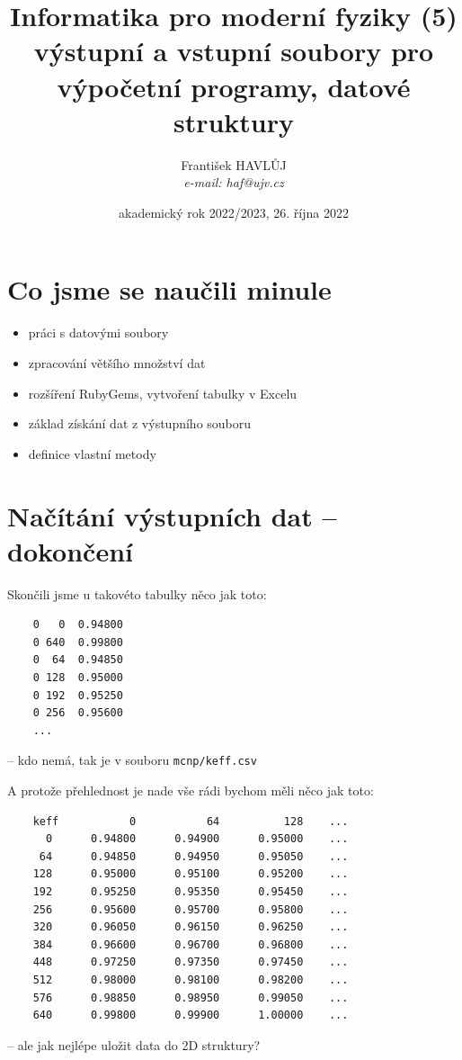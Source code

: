 \documentclass{beamer}
\title[IMF (5)]{Informatika pro moderní fyziky (5)\\výstupní a vstupní soubory pro výpočetní programy, datové struktury}
\author[Franti\v{s}ek HAVL\r{U}J, ORF ÚJV Řež]{Franti\v{s}ek HAVL\r{U}J\\{\scriptsize \emph{e-mail: haf@ujv.cz}}}
\date{akademický rok 2022/2023, 26. října 2022}
\institute[ORF ÚJV Řež]
{ÚJV Řež\\oddělení Reaktorové fyziky a podpory palivového cyklu}
\begin{document}
\begin{frame}
  \titlepage
\end{frame}

\begin{frame}
  \tableofcontents
\end{frame}

\section{Co jsme se naučili minule}

\begin{frame}{}
  \begin{itemize}
    \item práci s datovými soubory
    \item zpracování většího množství dat
    \item rozšíření RubyGems, vytvoření tabulky v Excelu
    \item základ získání dat z výstupního souboru
    \item definice vlastní metody
  \end{itemize}
\end{frame}

\section{Načítání výstupních dat – dokončení}

\begin{frame}[fragile]{Skončili jsme u takovéto tabulky}
  něco jak toto:
  {\scriptsize
  \begin{verbatim}
    0   0  0.94800
    0 640  0.99800
    0  64  0.94850
    0 128  0.95000
    0 192  0.95250
    0 256  0.95600
    ...
  \end{verbatim}
  }
  -- kdo nemá, tak je v souboru \texttt{mcnp/keff.csv}
\end{frame}

\begin{frame}[fragile]{A protože přehlednost je nade vše}
  rádi bychom měli něco jak toto:
  {\scriptsize
  \begin{verbatim}
    keff           0           64          128    ...
      0      0.94800      0.94900      0.95000    ...
     64      0.94850      0.94950      0.95050    ...
    128      0.95000      0.95100      0.95200    ...
    192      0.95250      0.95350      0.95450    ...
    256      0.95600      0.95700      0.95800    ...
    320      0.96050      0.96150      0.96250    ...
    384      0.96600      0.96700      0.96800    ...
    448      0.97250      0.97350      0.97450    ...
    512      0.98000      0.98100      0.98200    ...
    576      0.98850      0.98950      0.99050    ...
    640      0.99800      0.99900      1.00000    ...
  \end{verbatim}
  }
  -- ale jak nejlépe uložit data do 2D struktury?
\end{frame}
\end{document}
